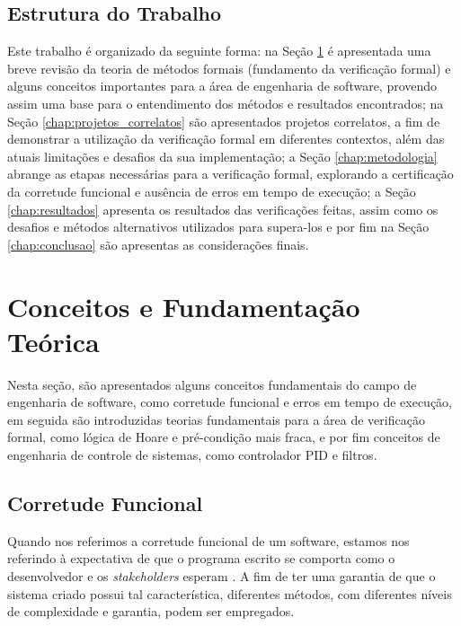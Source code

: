 \documentclass{article}
\begin{document}
    \subsection{Estrutura do Trabalho}
        Este trabalho é organizado da seguinte forma:  na Seção \ref{chap:revisao_teorica} é apresentada uma breve revisão da teoria de métodos formais (fundamento da verificação formal) e alguns
        conceitos importantes para a área de engenharia de software, provendo assim uma base para o entendimento dos métodos e resultados encontrados; na Seção \ref{chap:projetos_correlatos} são
        apresentados projetos correlatos, a fim de demonstrar a utilização da verificação formal em diferentes contextos, além das atuais limitações e desafios da sua implementação; a Seção
        \ref{chap:metodologia} abrange as etapas necessárias para a verificação formal, explorando a certificação da corretude funcional e ausência de erros em tempo de execução; a Seção
        \ref{chap:resultados} apresenta os resultados das verificações feitas, assim como os desafios e métodos alternativos utilizados para supera-los e por fim na Seção \ref{chap:conclusao} são
        apresentas as considerações finais.



\clearpage
\section{Conceitos e Fundamentação Teórica}\label{chap:revisao_teorica}
    Nesta seção, são apresentados alguns conceitos fundamentais do campo de engenharia de software, como corretude funcional e erros em tempo de execução, em seguida são introduzidas teorias fundamentais para a área de verificação formal, como lógica de Hoare e pré-condição mais fraca, e por fim conceitos de engenharia de controle de sistemas, como controlador PID e filtros. 
    
\subsection{Corretude Funcional}

    Quando nos referimos a corretude funcional de um software, estamos nos referindo à expectativa de que o programa escrito se comporta como o desenvolvedor e os \emph{stakeholders} esperam \cite{kosmatov2024guide}. A fim de ter uma garantia de que o sistema criado possui tal característica, diferentes métodos, com diferentes níveis de complexidade e garantia, podem ser empregados.
    
\end{document}
